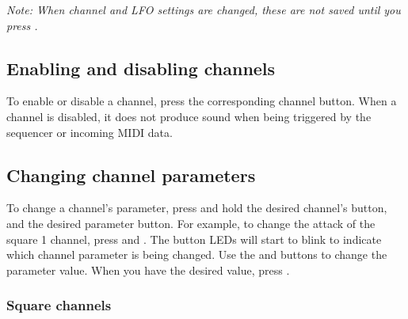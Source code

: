 \documentclass[a4paper, 12p, titlepaget]{book}
\newcommand {\btn}[1] {\framebox{\textbf{\footnotesize #1}}}
\begin{document}
\emph{Note: When channel and LFO settings are changed, these are not saved until you press \btn{SAVE}.}

\subsection{Enabling and disabling channels}
To enable or disable a channel, press the corresponding channel button. When a channel is disabled, it does not produce sound when being triggered by the sequencer or incoming MIDI data. 

\subsection{Changing channel parameters}
To change a channel's parameter, press and hold the desired channel's button, and the desired parameter button. For example, to change the attack of the square 1 channel, press \btn{SQ1} and \btn{A}. The button LEDs will start to blink to indicate which channel parameter is being changed. Use the \btn{UP} and \btn{DOWN} buttons to change the parameter value. When you have the desired value, press \btn{SET}. 

\subsubsection{Square channels}

\end{document}
